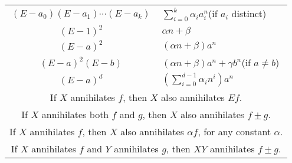 \begin{multicols}{5}
{\begin{tabular}{ | c | l | }
    $(E-a_0)(E-a_1)\cdots(E-a_k)$ & $\sum_{i=0}^k\alpha_ia_i^n$\hfill (if $a_i$ distinct) \\
    $(E - 1)^2$ & $\alpha n + \beta$ \\
    $(E - a)^2$ & $(\alpha n + \beta)a^n$ \\
    $(E - a)^2(E-b)$ & $(\alpha n + \beta)a^n+\gamma b^n$\hfill (if $a\neq b$)\\
    $(E - a)^d$ & $(\sum_{i=0}^{d-1}\alpha_in^i)a^n$ \\\hline\hline
    \multicolumn{2}{|c|}{If $X$ annihilates $f$, then $X$ also annihilates $E f$.} \\
    \multicolumn{2}{|c|}{If $X$ annihilates both $f$ and $g$, then $X$ also annihilates $f\pm g$.} \\
    \multicolumn{2}{|c|}{If $X$ annihilates $f$, then $X$ also annihilates $\alpha f$, for any constant $\alpha$.} \\\hline\hline
    \multicolumn{2}{|c|}{If $X$ annihilates $f$ and $Y$ annihilates $g$, then $XY$ annihilates $f\pm g$.} \\\hline
\end{tabular}
}

\end{multicols}

